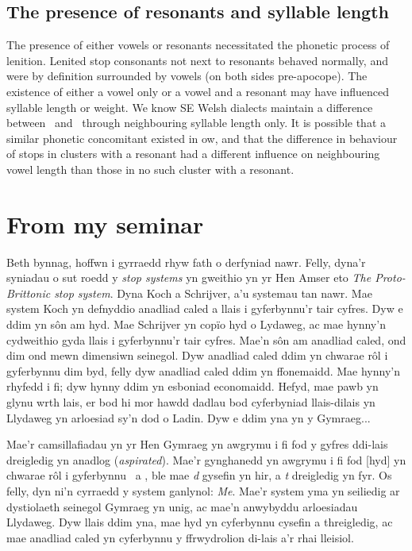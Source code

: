 \subsection{The presence of resonants and syllable length}
The presence of either vowels or resonants necessitated the phonetic process of lenition. Lenited stop consonants not next to resonants behaved normally, and were by definition surrounded by vowels (on both sides pre-apocope). The existence of either a vowel only or a vowel and a resonant may have influenced syllable length or weight. We know SE Welsh dialects maintain a difference between \xT\ and \xD\ through neighbouring syllable length only. It is possible that a similar phonetic concomitant existed in \gls{ow}, and that the difference in behaviour of stops in clusters with a resonant had a different influence on neighbouring vowel length than those in no such cluster with a resonant.

\section{From my seminar}
Beth bynnag, hoffwn i gyrraedd rhyw fath o derfyniad nawr. Felly, dyna'r syniadau o sut roedd y \textit{stop systems} yn gweithio yn yr Hen Amser eto \emph{The Proto-Brittonic stop system}. Dyna Koch a Schrijver, a'u systemau tan nawr. Mae system Koch yn defnyddio anadliad caled a llais i gyferbynnu'r tair cyfres. Dyw e ddim yn s\^on am hyd. Mae Schrijver yn cop\"io hyd o Lydaweg, ac mae hynny'n cydweithio gyda llais i gyferbynnu'r tair cyfres. Mae'n s\^on am anadliad caled, ond dim ond mewn dimensiwn seinegol. Dyw anadliad caled ddim yn chwarae r\^ol i gyferbynnu dim byd, felly dyw anadliad caled ddim yn ffonemaidd. Mae hynny'n rhyfedd i fi; dyw hynny ddim yn esboniad economaidd. Hefyd, mae pawb yn glynu wrth lais, er bod hi mor hawdd dadlau bod cyferbyniad llais-dilais yn Llydaweg yn arloesiad sy'n dod o Ladin. Dyw e ddim yna yn y Gymraeg...

Mae'r camsillafiadau yn yr Hen Gymraeg yn awgrymu i fi fod y gyfres ddi-lais dreigledig yn anadlog (\textit{aspirated}). Mae'r gynghanedd yn awgrymu i fi fod [hyd] yn chwarae r\^ol i gyferbynnu \xD\ a \lT, ble mae \textit{d} gysefin yn hir, a \textit{t} dreigledig yn fyr. Os felly, dyn ni'n cyrraedd y system ganlynol: \emph{Me}. Mae'r system yma yn seiliedig ar dystiolaeth seinegol Gymraeg yn unig, ac mae'n anwybyddu arloesiadau Llydaweg. Dyw llais ddim yna, mae hyd yn cyferbynnu cysefin a threigledig, ac mae anadliad caled yn cyferbynnu y ffrwydrolion di-lais a'r rhai lleisiol.

